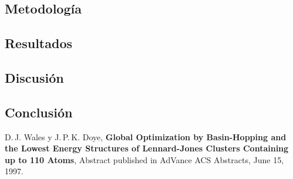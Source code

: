 \documentclass{article}
\begin{document}
\subsection{Metodología}

\subsection{Resultados}
\setcounter{equation}{0}

\subsection{Discusión}

\subsection{Conclusión}


\begin{thebibliography}{9}
D.\,J. Wales y J.\,P.\,K. Doye,
\textbf{Global Optimization by Basin-Hopping and the Lowest Energy Structures of Lennard-Jones Clusters Containing up to 110 Atoms}, Abstract published in AdVance ACS Abstracts, June 15, 1997.
\end{thebibliography}
\end{document}
